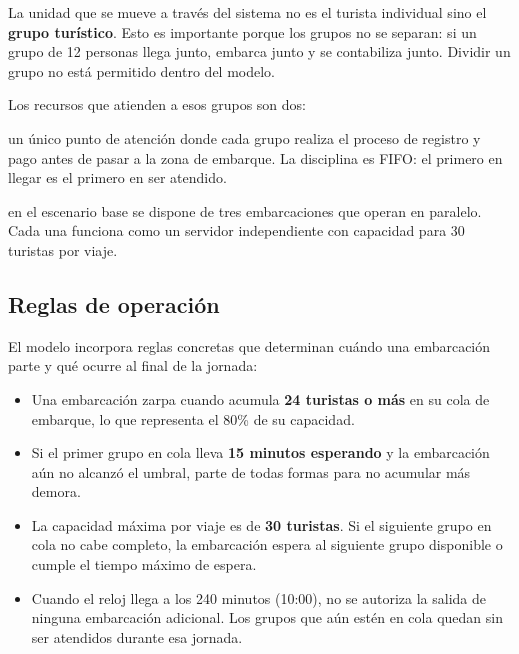 \documentclass[12pt,a4paper]{article}
\begin{document}
La unidad que se mueve a través del sistema no es el turista individual
sino el \textbf{grupo turístico}. Esto es importante porque los grupos no
se separan: si un grupo de 12 personas llega junto, embarca junto y se
contabiliza junto. Dividir un grupo no está permitido dentro del modelo.

Los recursos que atienden a esos grupos son dos:

\begin{description}[noitemsep]
  \item[Ventanilla de registro:] un único punto de atención donde cada
    grupo realiza el proceso de registro y pago antes de pasar a la zona
    de embarque. La disciplina es FIFO: el primero en llegar es el primero
    en ser atendido.
  \item[Embarcaciones:] en el escenario base se dispone de tres
    embarcaciones que operan en paralelo. Cada una funciona como un
    servidor independiente con capacidad para 30 turistas por viaje.
\end{description}

\subsection{Reglas de operación}

El modelo incorpora reglas concretas que determinan cuándo una embarcación
parte y qué ocurre al final de la jornada:

\begin{itemize}[noitemsep]
  \item Una embarcación zarpa cuando acumula \textbf{24 turistas o más}
    en su cola de embarque, lo que representa el 80\% de su capacidad.
  \item Si el primer grupo en cola lleva \textbf{15 minutos esperando} y
    la embarcación aún no alcanzó el umbral, parte de todas formas para
    no acumular más demora.
  \item La capacidad máxima por viaje es de \textbf{30 turistas}. Si el
    siguiente grupo en cola no cabe completo, la embarcación espera al
    siguiente grupo disponible o cumple el tiempo máximo de espera.
  \item Cuando el reloj llega a los 240 minutos (10:00), no se autoriza
    la salida de ninguna embarcación adicional. Los grupos que aún estén
    en cola quedan sin ser atendidos durante esa jornada.
\end{itemize}

\end{document}
